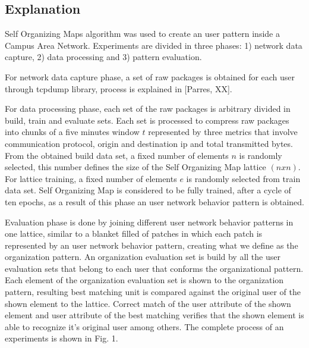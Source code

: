 \documentclass{article}
\begin{document}
\subsection{Explanation} %
Self Organizing Maps algorithm was used to create an user pattern inside a Campus Area Network. Experiments are divided in three phases: 1) network data capture, 2) data processing and 3) pattern evaluation.

For network data capture phase, a set of raw packages is obtained for each user through tcpdump library, process is explained in [Parres, XX].

For data processing phase, each set of the raw packages is arbitrary divided in build, train and evaluate sets.
Each set is processed to compress raw packages into chunks of a five minutes window $t$ represented by three metrics that involve communication protocol, origin and destination ip and total transmitted bytes.
From the obtained build data set, a fixed number of elements $n$ is randomly selected, this number defines the size of the Self Organizing Map lattice $(n x n)$.
For lattice training, a fixed number of elements $e$ is randomly selected from train data set. Self Organizing Map is considered to be fully trained, after a cycle of ten epochs, as a result of this phase an user network behavior pattern is obtained.

Evaluation phase is done by joining different user network behavior patterns in one lattice, similar to a blanket filled of patches in which each patch is represented by an user network behavior pattern, creating what we define as the organization pattern. An organization evaluation set is build by all the user evaluation sets that belong to each user that conforms the organizational pattern. Each element of the organization evaluation set is shown to the organization pattern, resulting best matching unit is compared against the original user of the shown element to the lattice. Correct match of the user attribute of the shown element and user attribute of the best matching verifies that the shown element is able to recognize it's original user among others. The complete process of an experiments is shown in Fig. 1.
\end{document}
